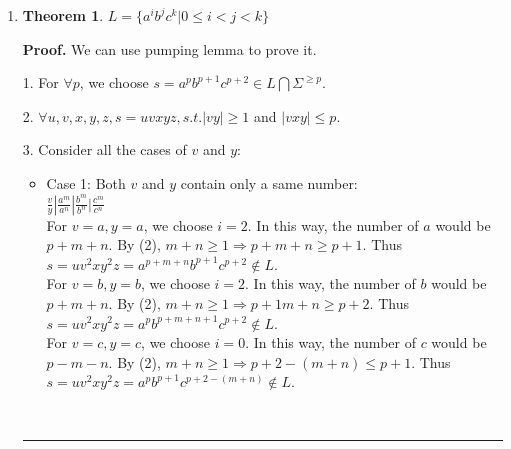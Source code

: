 \documentclass{article}%
\newtheorem{theorem}{Theorem}
\newenvironment{proof}[1][Proof]{\textbf{#1.} }{\ \rule{0.5em}{0.5em}}
\begin{document}
\begin{enumerate}
\begin{enumerate}
\begin{proof}
\begin{itemize}
	\item Case 3: Either $v$ or $y$ contain two numbers and $m \geq 1, n \geq 1, k \geq 1$: \\
	
	$\frac{v}{y} | \frac{0^m1^k}{1^n}| \frac{0^m}{0^n1^k}| \frac{1^m2^k}{2^n}| \frac{1^m}{1^n2^k}| \frac{2^m 1^k}{3^n}| \frac{2^m}{2^n3^k}$\\
	
	When $i = 2$, $s$ will have interleaving patterns, such as $0^m1^k0^m1^k$. Thus $s = uv^2xy^2z \notin L$.
	
	
\end{itemize}
5. 	$ L = \{ 0^i 1^j 2^i 3^j |i,j \ge 1\} $ is non-context-free.
	\end{proof}
	
			\item 
	\begin{theorem}
$ L = \{ a^i b^j c^k |0 \le i < j < k\} $
	\end{theorem}
	\begin{proof}
	We can use pumping lemma to prove it.
	
  1. For $\forall p$, we choose $s = a^p b^{p+1} c^{p+2} \in L \bigcap \Sigma ^{\geq p}$. 
  
  2. $\forall u,v,x,y,z, s = uvxyz, s.t. |vy| \geq 1$ and $|vxy| \leq p$.
  
  3. Consider all the cases of $v$ and $y$:
  
\begin{itemize}
	\item Case 1: Both $v$ and $y$ contain only a same number: \\
	
	$\frac{v}{y} | \frac{a^m}{a^n}| \frac{b^m}{b^n}| \frac{c^m}{c^n}$\\
	
	For $v = a , y = a$, we choose $i = 2$. In this way, the number of $a$ would be $p+m+n$. By (2), $m+n \geq 1 \Rightarrow p+m+n \geq p + 1$. Thus $s = uv^2xy^2z = a^{p+m+n}b^{p+1}c^{p+2} \notin L$. \\
	
  For $v = b , y = b$, we choose $i = 2$. In this way, the number of $b$ would be $p+m+n$. By (2), $m+n \geq 1 \Rightarrow p+1m+n \geq p + 2$. Thus $s = uv^2xy^2z = a^{p}b^{p+m+n+1}c^{p+2} \notin L$. \\
		
	For $v = c , y = c$, we choose $i = 0$. In this way, the number of $c$ would be $p-m-n$. By (2), $m+n \geq 1 \Rightarrow p+2-(m+n) \leq p + 1$. Thus $s = uv^2xy^2z = a^{p}b^{p+1}c^{p+2-(m+n)} \notin L$. \\
	

\end{itemize}
\end{proof}
\end{enumerate}
\end{enumerate}
\end{document}

